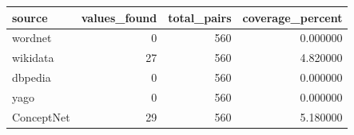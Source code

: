\begin{tabular}{lrrr}
\toprule
source & values_found & total_pairs & coverage_percent \\
\midrule
wordnet & 0 & 560 & 0.000000 \\
wikidata & 27 & 560 & 4.820000 \\
dbpedia & 0 & 560 & 0.000000 \\
yago & 0 & 560 & 0.000000 \\
ConceptNet & 29 & 560 & 5.180000 \\
\bottomrule
\end{tabular}

